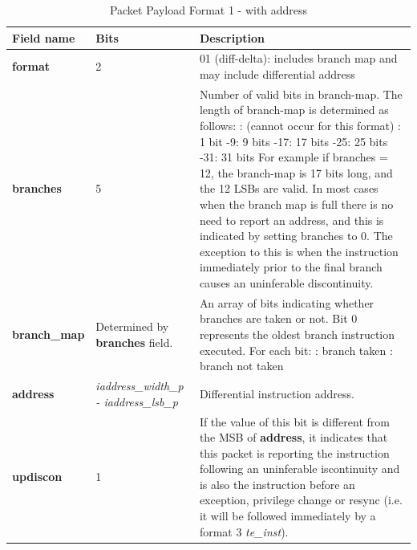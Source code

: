 \begin{table}[htp]
  \centering
  \caption{Packet Payload Format 1 - with address}
  \label{tab:te_inst0-1-addr}
  \begin{tabulary}{\textwidth}{|l|p{35mm}|p{80mm}|}
    \hline
    {\bf Field name} & {\bf Bits} & {\bf Description} \\
    \hline
    \textbf{format}	& 2	& 01 (diff-delta): includes branch map and may include differential address\\
    \hline
    \textbf{branches} & 5 & Number of valid bits in branch-map. The length of branch-map is determined as follows: :      (cannot occur for this format) : 	1 bit -9: 	9 bits -17: 	17 bits -25: 	25 bits -31: 	31 bits \newline
    For example if branches = 12, the branch-map is 17 bits long, and the 12 LSBs are valid. \newline
    In most cases when the branch map is full there is no need to report an address,
    and this is indicated by setting branches to 0.  The exception to this is when 
    the instruction immediately prior to the final branch causes an uninferable discontinuity.\\
    \hline
    \textbf{branch\_map} & Determined by \newline 
                 \textbf{branches} field. & 
                 An array of bits indicating whether branches are taken or not.\newline
    Bit 0 represents the oldest branch instruction executed.   For each bit: : branch taken : branch not taken \\
    \hline
    \textbf{address}	& \textit {iaddress\_width\_p - iaddress\_lsb\_p} & 
                Differential instruction address.\\
    \hline
    \textbf{updiscon}	& 1 & 
                If the value of this bit is different from the MSB of \textbf{address}, it indicates that this 
                packet is reporting the instruction following an uninferable iscontinuity and is also the 
                instruction before an exception, privilege change or resync 
                (i.e. it will be followed immediately by a format 3 \textit{te\_inst}).\\
    \hline
  \end{tabulary}
\end{table}

